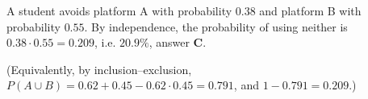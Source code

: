 A student avoids platform A with probability $0.38$ and platform B with probability $0.55$. By independence, the probability of using neither is $0.38\cdot0.55=0.209$, i.e. $\boxed{20.9\%}$, answer \textbf{C}.

(Equivalently, by inclusion--exclusion, $P(A\cup B)=0.62+0.45-0.62\cdot0.45=0.791$, and $1-0.791=0.209$.)

